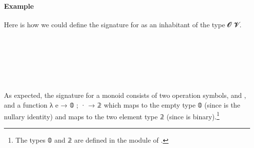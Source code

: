\paragraph{Example}\label{example}

Here is how we could define the signature for  as an inhabitant of the type  \ab 𝓞 \ab 𝓥.
\ccpad
\begin{code}%
\>[1]\AgdaSpace{}%
\AgdaSpace{}%
\AgdaSymbol{:}\AgdaSpace{}%
\AgdaSpace{}%
\AgdaSpace{}%
\<%
\\
\>[1][@{}l@{\AgdaIndent{0}}]%
\>[2]\AgdaSpace{}%
\AgdaSymbol{:}\AgdaSpace{}%
\<%
\\
%
\>[2]\AgdaSpace{}%
\AgdaSymbol{:}\AgdaSpace{}%
\<%
\\
%
\\[\AgdaEmptyExtraSkip]%
%
\>[1]\AgdaSpace{}%
\AgdaSymbol{:}\AgdaSpace{}%
\AgdaSpace{}%
\AgdaSpace{}%
\<%
\\
%
\>[1]\AgdaSpace{}%
\AgdaSymbol{=}\AgdaSpace{}%
\AgdaSpace{}%
\AgdaOperator{\AgdaInductiveConstructor{,}}\AgdaSpace{}%
\AgdaSpace{}%
\AgdaSymbol{\{}\AgdaSpace{}%
\AgdaSpace{}%
\AgdaSpace{}%
\AgdaSymbol{;}\AgdaSpace{}%
\AgdaSpace{}%
\AgdaSpace{}%
\AgdaSpace{}%
\AgdaSymbol{\}}\<%
\end{code}
\ccpad
As expected, the signature for a monoid consists of two operation symbols,  and , and a function
\as λ \as{\{} \aic e \as → \af 𝟘 \as ; \aic · \as → \af 𝟚 \as{\}} which maps  to the empty type \af 𝟘 (since  is the nullary identity) and maps  to the two element type \af 𝟚 (since  is binary).\footnote{The types \af 𝟘 and \af 𝟚 are defined in the  module of \typtop.}
